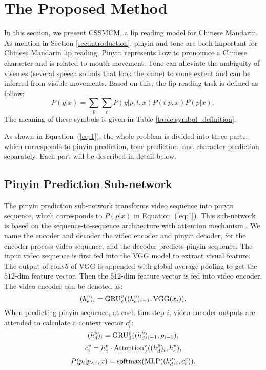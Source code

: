 \documentclass[sigconf]{acmart}
\begin{document}
\section{The Proposed Method}
In this section, we present CSSMCM, a lip reading model for Chinese Mandarin. As mention in Section \ref{sec:introduction}, pinyin and tone are both important for Chinese Mandarin lip reading. Pinyin represents how to pronounce a Chinese character and is related to mouth movement. Tone can alleviate the ambiguity of visemes (several speech sounds that look the same) to some extent and can be inferred from visible movements. Based on this, the lip reading task is defined as follow:
\begin{equation}\label{eq:1}
P(y|x) = \sum_p\sum_t P(y|p, t, x)P(t|p, x)P(p|x),
\end{equation}  
The meaning of these symbols is given in Table \ref{table:symbol_definition}.

As shown in Equation~(\ref{eq:1}), the whole problem is divided into three parts, which corresponds to pinyin prediction, tone prediction, and character prediction separately. Each part will be described in detail below.

\subsection{Pinyin Prediction Sub-network}\label{sec:pinyin_prediction_sub-network}

The pinyin prediction sub-network transforms video sequence into pinyin sequence, which corresponds to $P(p|x)$ in Equation~(\ref{eq:1}). This sub-network is based on the sequence-to-sequence architecture with attention mechanism \cite{bahdanau2015neural}. We name the encoder and decoder the video encoder and pinyin decoder, for the encoder process video sequence, and the decoder predicts pinyin sequence. The input video sequence is first fed into the VGG model \cite{chatfield2014return} to extract visual feature. The output of conv5 of VGG is appended with global average pooling \cite{lin2014network} to get the $512$-dim feature vector. Then the $512$-dim feature vector is fed into video encoder. The video encoder can be denoted as:
\begin{equation}
(h^v_e)_i = {\rm GRU}^v_e((h^v_e)_{i-1}, {\rm VGG}(x_i)).
\end{equation}
When predicting pinyin sequence, at each timestep $i$, video encoder outputs are attended to calculate a context vector $c^v_i$:
\begin{equation}
(h^p_d)_i = {\rm GRU^p_d}((h^p_d)_{i-1}, p_{i-1}),
\end{equation}
\begin{equation}
c^v_i = h^v_e \cdot {\rm Attention^v_p}((h^p_d)_i, h^v_e),
\end{equation}
\begin{equation}
P(p_i|p_{<{i}}, x) = {\rm softmax}({\rm MLP}((h^p_d)_i, c^v_i)).
\end{equation}
\end{document}
